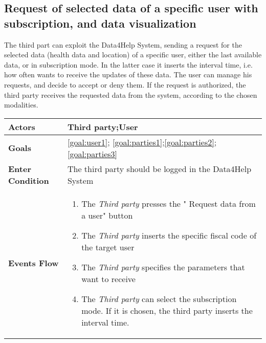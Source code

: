  \subsection{Request of selected data of a specific user with subscription, and data visualization}
 
The third part can exploit the Data4Help System, sending a request for the selected data (health data and location) of a specific user, either the last available data, or in subscription mode.  
 In the latter case  it inserts the interval time, i.e. how often wants to receive the updates of these data.
The user can manage his requests, and decide to accept or deny them. If the request is authorized, the third party receives the requested data from the system, according to the chosen modalities.

\begin{table}[H]
	\centering
    
    \begin{tabular}{|p{3.5cm}|p{10.3cm}|}
    
    \hline
    \textbf{\large{Actors}}  			& \tabitem Third party;\tabitem  User  									\\
    				 			
    \hline
    \textbf{\large{Goals}} 				&\ref{goal:user1}; \ref{goal:parties1};\ref{goal:parties2};\ref{goal:parties3}\\
    
    \hline
    \textbf{\large{Enter Condition}} & The third party should be logged in the Data4Help System	\\
    
    \hline
    \textbf{\large{Events Flow}}		& \begin{enumerate}[leftmargin=0.5cm]
                                          	\item The \emph{Third party}  presses the " Request data  from a user" button
                                            \item The \emph{Third party} inserts the specific fiscal code of the target user
                                            \item The \emph{Third party} specifies the parameters that want to receive
                                            
                                            \item The \emph{Third party} can select the subscription mode. If 
                            it is chosen, the third party inserts the interval time. 
                            

\end{enumerate}
\end{tabular}
\end{table}
